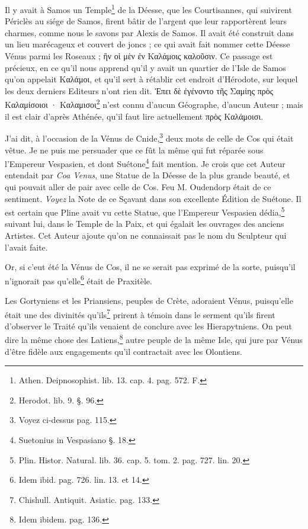 \documentclass[a4paper, 18pt, oneside]{article}
\begin{document}
Il y avait à Samos un Temple\footnote{Athen. Deipnosophist. lib. 13. cap. 4. pag. 572. F.} de la Déesse, que les Courtisannes, qui suivirent Périclès au siége de Samos, firent bâtir de l'argent que leur rapportèrent leurs charmes, comme nous le savons par Alexis de Samos. Il avait été construit dans un lieu marécageux et couvert de joncs ; ce qui avait fait nommer cette Déesse Vénus parmi les Roseaux ; ἣν οἱ μὲν ἐν Καλάμοις καλοῦσιν. Ce passage est précieux, en ce qu'il nous apprend qu'il y avait un quartier de l'Isle de Samos qu'on appelait Καλάμοι, et qu'il sert à rétablir cet endroit d'Hérodote, sur lequel les deux derniers Editeurs n'ont rien dit. Ἐπει δὲ ἐγένοντο τῆς Σαμίης πρὸς Καλαμίσοιοι · Καλαμισοι\footnote{Herodot. lib. 9. §. 96.} n'est connu d'aucun Géographe, d'aucun Auteur ; mais il est clair d'après Athénée, qu'il faut lire actuellement πρὸς Καλάμοισι.

J'ai dit, à l'occasion de la Vénus de Cnide,\footnote{Voyez ci-dessus pag. 115.} deux mots de celle de Cos qui était vêtue. Je ne puis me persuader que ce fût la même qui fut réparée sous l'Empereur Vespasien, et dont Suétone\footnote{Suetonius in Vespasiano §. 18.} fait mention. Je crois que cet Auteur entendait par \emph{Coa Venus}, une Statue de la Déesse de la plus grande beauté, et qui pouvait aller de pair avec celle de Cos. Feu M. Oudendorp était de ce sentiment. \emph{Voyez} la Note de ce Sçavant dans son excellente Édition de Suétone. Il est certain que Pline avait vu cette Statue, que l'Empereur Vespasien dédia,\footnote{Plin. Histor. Natural. lib. 36. cap. 5. tom. 2. pag. 727. lin. 20.} suivant lui, dans le Temple de la Paix, et qui égalait les ouvrages des anciens Artistes. Cet Auteur ajoute qu'on ne connaissait pas le nom du Sculpteur qui l'avait faite.

Or, si c'eut été la Vénus de Cos, il ne se serait pas exprimé de la sorte, puisqu'il n'ignorait pas qu'elle\footnote{Idem ibid. pag. 726. lin. 13. et 14.} était de Praxitèle.

Les Gortyniens et les Priansiens, peuples de Crète, adoraient Vénus, puisqu'elle était une des divinités qu'ils\footnote{Chishull. Antiquit. Asiatic. pag. 133.} prirent à témoin dans le serment qu'ils firent d'observer le Traité qu'ils venaient de conclure avec les Hierapytniens. On peut dire la même chose des Latiens,\footnote{Idem ibidem. pag. 136.} autre peuple de la même Isle, qui jure par Vénus d'être fidèle aux engagements qu'il contractait avec les Olontiens.
\end{document}
